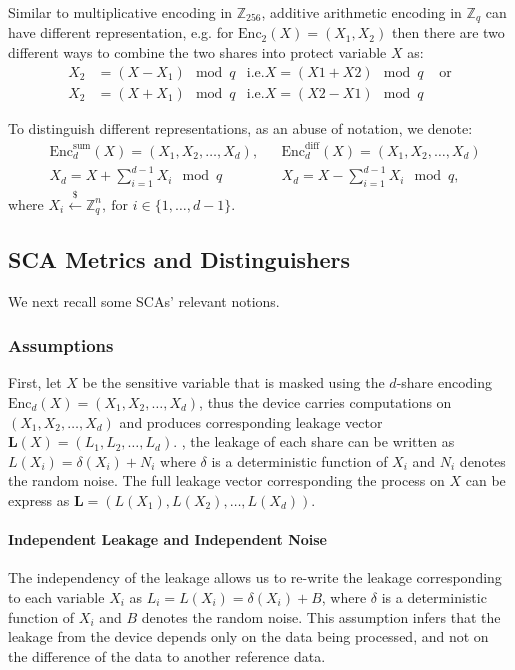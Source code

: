 \documentclass{llncs}
\begin{document}
Similar to multiplicative encoding in $\mathbb{Z}_{256}$, additive arithmetic encoding in $\mathbb{Z}_q$ can have different representation, e.g. for $\text{Enc}_{2}(X) = (X_1, X_2)$ then there are two different ways to combine the two shares into protect variable $X$ as:
\begin{align*}
	X_2 &= (X - X_1) \mod q & \text{i.e.} X = (X1 + X2)\mod q & \text{ or}\\
	X_2 &= (X + X_1) \mod q & \text{i.e.} X = (X2 - X1)\mod q
\end{align*}

To distinguish different representations, as an abuse of notation, we denote:
\begin{align*}
	&\text{Enc}^{\text{sum}}_{d}(X) = (X_1, X_2, \dots, X_d)   ,  &  &\text{Enc}^{\text{diff}}_{d}(X) = (X_1, X_2, \dots, X_d) \\
	&X_d = X + \sum_{i =1}^{d-1}X_i \mod q    &  &X_d = X - \sum_{i =1}^{d-1}X_i \mod q ,
\end{align*}
where $X_i \overset{\$}{\leftarrow} \mathbb{Z}_q^n,\ \text{for } i \in \{1, \dots, d-1\}$.
\subsection*{SCA Metrics and Distinguishers}
We next recall some SCAs' relevant notions.
\subsubsection*{Assumptions}
First, let $X$ be the sensitive variable that is masked using the $d$-share encoding $\text{Enc}_d(X) = (X_1, X_2, \dots, X_d)$, thus the device carries computations on $(X_1, X_2, \dots, X_d)$ and produces corresponding leakage vector $\bm{L}(X) = (L_1, L_2, \dots, L_d)$.
, the leakage of each share can be written as $L(X_i) = \delta(X_i) + N_i$ where $\delta$ is a deterministic function of $X_i$ and $N_i$ denotes the random noise. The full leakage vector corresponding the process on $X$ can be express as $\mathbf{L} = (L(X_1), L(X_2), \dots, L(X_d))$.
\paragraph{Independent Leakage and Independent Noise}
The independency of the leakage allows us to re-write the leakage corresponding to each variable $X_i$ as $L_i = L(X_i) = \delta(X_i) + B$, where $\delta$ is a deterministic function of $X_i$ and $B$ denotes the random noise. This assumption infers that the leakage from the device depends only on the data being processed, and not on the difference of the data to another reference data.
\end{document}
